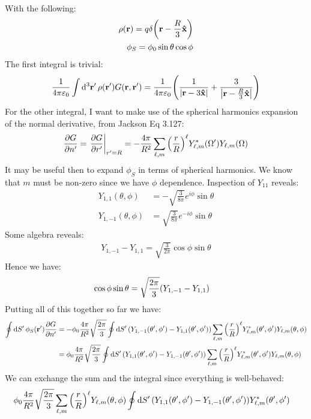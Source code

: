 \documentclass[12pt]{article}
\begin{document}
With the following:
\begin{align*}
  \rho(\vb{r})=q\delta\qty(\vb{r}-\frac{R}{3}\vu{x})\\
  \phi_S=\phi_0\sin\theta\cos\phi
\end{align*}
The first integral is trivial:
\begin{align*}
  \frac1{4\pi\varepsilon_0}\int\dd[3]{\vb{r}'}\rho(\vb{r}')G(\vb{r,r}')=
  \frac1{4\pi\varepsilon_0}\qty(\frac1{\abs{\vb{r}-3\vu{x}}}
  +\frac{3}{\abs{\vb{r}-\frac{R}{3}\vu{x}}})\\
\end{align*}
For the other integral, I want to make use of the spherical harmonics expansion of the normal derivative, from Jackson Eq 3.127:
\begin{align*}
  \pdv{G}{n'}=\eval{\pdv{G}{r'}}_{r'=R}
  =-\frac{4\pi}{R^2}\sum_{\ell,m}\qty(\frac{r}{R})^\ell
  Y^*_{\ell,m}(\Omega')Y_{\ell,m}(\Omega)
\end{align*}
It may be useful then to expand $\phi_S$ in terms of spherical harmonics. We know that $m$ must be non-zero since we have $\phi$ dependence. Inspection of $Y_{11}$ reveals:
\begin{align*}
  Y_{1,1}(\theta,\phi)&=-\sqrt{\frac{3}{8\pi}}e^{i\phi}\sin\theta\\
  Y_{1,-1}(\theta,\phi)&=\sqrt{\frac{3}{8\pi}}e^{-i\phi}\sin\theta
\end{align*}
Some algebra reveals:
\begin{align*}
  Y_{1,-1}-Y_{1,1}=\sqrt{\frac{3}{2\pi}}\cos\phi\sin\theta
\end{align*}
Hence we have:
\begin{align*}
  \cos\phi\sin\theta&=\sqrt{\frac{2\pi}{3}}\qty(Y_{1,-1}-Y_{1,1})
\end{align*}
Putting all of this together so far we have:
\begin{align*}
  \oint\dd{S'}\phi_S(\vb{r}')\pdv{G}{n'}&=
  -\phi_0\frac{4\pi}{R^2}\sqrt{\frac{2\pi}{3}}\oint\dd{S'}
  \qty(Y_{1,-1}(\theta',\phi')-Y_{1,1}(\theta',\phi'))
  \sum_{\ell,m}\qty(\frac{r}{R})^\ell
  Y^*_{\ell,m}(\theta',\phi')Y_{\ell,m}(\theta,\phi)\\
  &=\phi_0\frac{4\pi}{R^2}\sqrt{\frac{2\pi}{3}}\oint\dd{S'}
  \qty(Y_{1,1}(\theta',\phi')-Y_{1,-1}(\theta',\phi'))
  \sum_{\ell,m}\qty(\frac{r}{R})^\ell
  Y^*_{\ell,m}(\theta',\phi')Y_{\ell,m}(\theta,\phi)
\end{align*}
We can exchange the sum and the integral since everything is well-behaved:
\begin{align*}
  &\phi_0\frac{4\pi}{R^2}\sqrt{\frac{2\pi}{3}}
  \sum_{\ell,m}\qty(\frac{r}{R})^\ell Y_{\ell,m}(\theta,\phi)\oint\dd{S'}
  \qty(Y_{1,1}(\theta',\phi')-Y_{1,-1}(\theta',\phi'))
  Y^*_{\ell,m}(\theta',\phi')
\end{align*}
\end{document}
